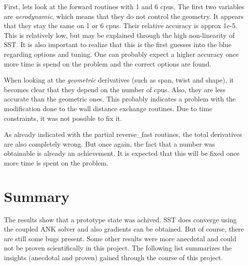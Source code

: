 \noindent First, lets look at the forward routines with 1 and 6 cpus. The first
two variables are \textit{aerodynamic}, which means that they do not control
the geometry. It appears that they stay the same on 1 or 6 cpus. Their relative
accuracy is approx 1e-5. This is relatively low, but may be explained through
the high non-linearity of SST. It is also important to realize that this is
the first guesses into the blue regarding options and tuning. One can probably
expect a higher accuracy once more time is spend on the problem and the correct
options are found.

When looking at the \textit{geometric} derivatives (such as span, twist and
shape), it becomes clear that they depend on the number of cpus. Also, they are
less accurate than the geometric ones. This probably indicates a problem with
the modification done to the wall distance exchange routines. Due to time
constraints, it was not possible to fix it.

As already indicated with the partial reverse\_fast routines, the total
derivatives are also completely wrong. But once again, the fact that a number
was obtainable is already an achievement. It is expected that this will be
fixed once more time is spent on the problem.







\section{Summary}
The results show that a prototype state was achived. SST does converge using
the coupled ANK solver and also gradients can be obtained. But of course, there
are still some bugs present. Some other results were more anecdotal and could
not be proven scientifically in this project. The following list summarizes the
insights (anecdotal and proven) gained through the course of this project.

